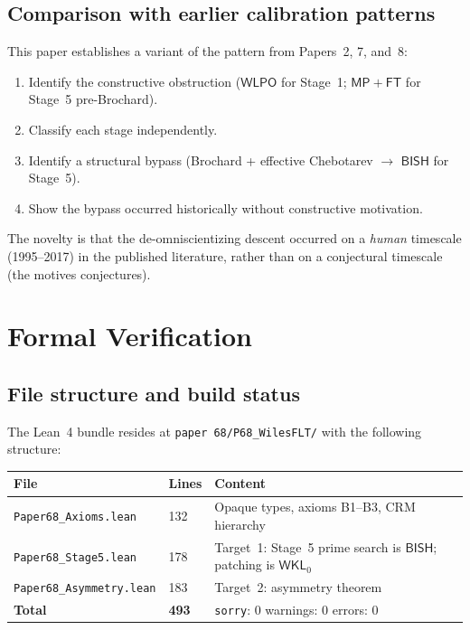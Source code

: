 \documentclass[11pt]{article}
\theoremstyle{plain}
\theoremstyle{definition}
\theoremstyle{remark}
\newcommand{\BISH}{\mathsf{BISH}}
\newcommand{\WLPO}{\mathsf{WLPO}}
\newcommand{\MP}{\mathsf{MP}}
\newcommand{\FT}{\mathsf{FT}}
\newcommand{\WKL}{\mathsf{WKL}_0}
\begin{document}
\subsection{Comparison with earlier calibration patterns}

This paper establishes a variant of the pattern from Papers~2, 7,
and~8:
\begin{enumerate}[nosep]
\item Identify the constructive obstruction ($\WLPO$ for Stage~1;
  $\MP + \FT$ for Stage~5 pre-Brochard).
\item Classify each stage independently.
\item Identify a structural bypass (Brochard + effective Chebotarev
  $\to$ $\BISH$ for Stage~5).
\item Show the bypass occurred historically without constructive motivation.
\end{enumerate}
The novelty is that the de-omniscientizing descent occurred on a
\emph{human} timescale (1995--2017) in the published literature,
rather than on a conjectural timescale (the motives conjectures).


\section{Formal Verification}\label{sec:formal}

\subsection{File structure and build status}

The Lean~4 bundle resides at \texttt{paper~68/P68\_WilesFLT/}
with the following structure:

\begin{center}
\renewcommand{\arraystretch}{1.15}
\begin{tabular}{@{}llp{6.8cm}@{}}
\toprule
\textbf{File} & \textbf{Lines} & \textbf{Content} \\
\midrule
\texttt{Paper68\_Axioms.lean} & 132 &
  Opaque types, axioms B1--B3, CRM hierarchy \\
\texttt{Paper68\_Stage5.lean} & 178 &
  Target~1: Stage~5 prime search is $\BISH$; patching is $\WKL$ \\
\texttt{Paper68\_Asymmetry.lean} & 183 &
  Target~2: asymmetry theorem \\
\midrule
\textbf{Total} & \textbf{493} &
  \texttt{sorry}: 0 \quad warnings: 0 \quad errors: 0 \\
\bottomrule
\end{tabular}
\end{center}
\end{document}
